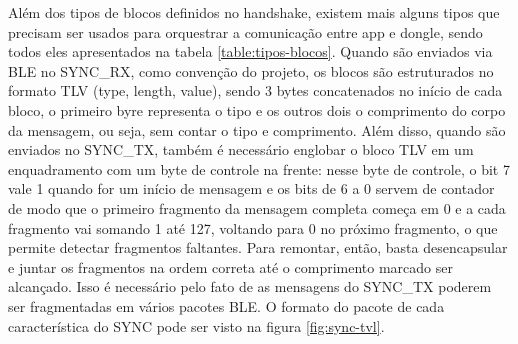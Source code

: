 \documentclass[
	12pt,
	article,			%
	oneside,
	a4paper,
	english,
	brazil				%
	]{abntex2}
\begin{document}
Além dos tipos de blocos definidos no handshake, existem mais alguns tipos que precisam ser usados para orquestrar a comunicação entre app e dongle, sendo
todos eles apresentados na tabela \ref{table:tipos-blocos}. Quando são enviados via BLE no SYNC\_RX, como convenção do projeto, os blocos são estruturados no formato TLV (type, length, value), 
sendo 3 bytes concatenados no início de cada bloco, o primeiro byre representa o tipo e os outros dois o comprimento do corpo da mensagem, ou seja, sem contar o tipo e comprimento. Além disso, quando são
enviados no SYNC\_TX, também é necessário englobar o bloco TLV em um enquadramento com um byte de controle na frente: nesse byte de controle, o bit 7 vale 1 quando for um início de mensagem e os bits de 6 a 0
servem de contador de modo que o primeiro fragmento da mensagem completa começa em 0 e a cada fragmento vai somando 1 até 127, voltando para 0 no próximo fragmento, o que permite detectar fragmentos faltantes.
Para remontar, então, basta desencapsular e juntar os fragmentos na ordem correta até o comprimento marcado ser alcançado.
Isso é necessário pelo fato de as mensagens do SYNC\_TX poderem ser fragmentadas em vários pacotes BLE. O formato do pacote de cada característica do SYNC pode ser visto na figura \ref{fig:sync-tvl}.
\end{document}
